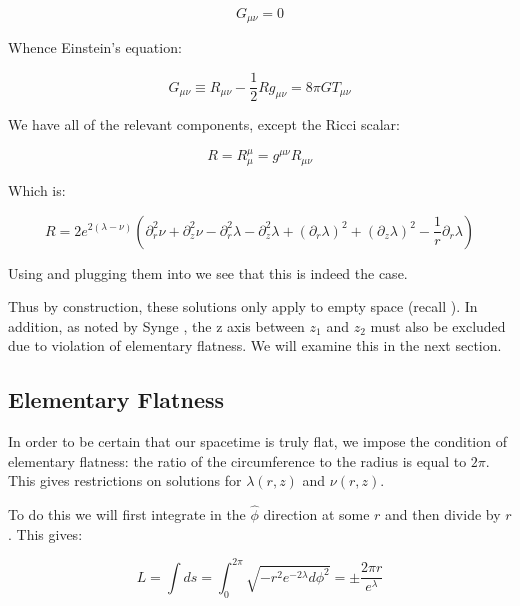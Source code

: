 \documentclass{article}
\begin{document}
\begin{equation}
G_{\mu\nu}=0
\end{equation}

Whence Einstein's equation:

\begin{equation}
G_{\mu\nu}\equiv R_{\mu\nu}-\frac{1}{2}Rg_{\mu\nu}=8\pi GT_{\mu\nu}
\label{eq:einstein}
\end{equation}

We have all of the relevant components, except the Ricci scalar:

\begin{equation}
R=R_{\mu}^{\mu}=g^{\mu\nu}R_{\mu\nu}
\end{equation}

Which is:

\begin{equation}
R=2e^{2\left(\lambda-\nu\right)}\left(\partial^{2}_{r}\nu+\partial^{2}_{z}\nu-\partial^{2}_{r}\lambda-\partial^{2}_{z}\lambda+\left(\partial_{r}\lambda\right)^{2}+\left(\partial_{z}\lambda\right)^{2}-\frac{1}{r}\partial_{r}\lambda\right)\label{eq:R}
\end{equation}

Using  and plugging them into  we see that this is indeed the case.

Thus by construction, these solutions only apply to empty space (recall ). In addition, as noted by Synge \cite{synge_relativity}, the z axis between $z_1$ and $z_2$ must also be excluded due to violation of elementary flatness. We will examine this in the next section.

\subsection{Elementary Flatness}

In order to be certain that our spacetime is truly flat, we impose the condition of elementary flatness: the ratio of the circumference to the radius is equal to $2\pi$. This gives restrictions on solutions for $\lambda\left(r,z\right)$ and $\nu\left(r,z\right)$.

To do this we will first integrate in the $\hat{\phi}$ direction at
some $r$ and then divide by $r$. This gives:

\begin{equation}
  \label{eq:phi-hat-length}
  L=\int ds =
  \int_0^{2\pi}\sqrt{-r^2e^{-2\lambda}d\phi^2}=\pm\frac{2\pi r}{e^{\lambda}}
\end{equation}
\end{document}

